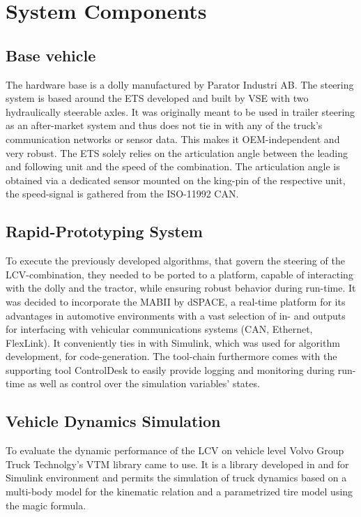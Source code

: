\documentclass[root.tex]{subfiles}
\begin{document}
{\pagestyle{empty}}
\section{System Components}
\label{chap:Hardware-Setup}
\subsection{Base vehicle}
\label{sec:basevehicle}

The hardware base is a dolly manufactured by Parator Industri AB\cite{paratorAB}. The steering system is based around the \gls{ETS} developed and built by \gls{VSE}\cite{vse} with two hydraulically steerable axles. It was originally meant to be used in trailer steering as an after-market system and thus does not tie in with any of the truck's communication networks or sensor data. This makes it OEM-independent and very robust. The \gls{ETS} solely relies on the articulation angle between the leading and following unit and the speed of the combination. The articulation angle is obtained via a dedicated sensor mounted on the king-pin of the respective unit, the speed-signal is gathered from the ISO-11992 \gls{CAN}. 

\subsection{Rapid-Prototyping System}

To execute the previously developed algorithms, that govern the steering of the \gls{LCV}-combination, they needed to be ported to a platform, capable of interacting with the dolly and the tractor, while ensuring robust behavior during run-time. It was decided to incorporate the \gls{MABII}\cite{mabii} by dSPACE\cite{dspace}, a real-time platform for its advantages in automotive environments with a vast selection of in- and outputs for interfacing with vehicular communications systems (\gls{CAN}, Ethernet, FlexLink). It conveniently ties in with Simulink, which was used for algorithm development, for code-generation. %
 The tool-chain furthermore comes with the supporting tool ControlDesk to easily provide logging and monitoring during run-time as well as control over the simulation variables' states.


\subsection{Vehicle Dynamics Simulation}
To evaluate the dynamic performance of the \gls{LCV} on vehicle level Volvo Group Truck Technolgy's\cite{volvogtt} \gls{VTM} library came to use. It is a library developed in and for Simulink environment and permits the simulation of truck dynamics based on a multi-body model for the kinematic relation and a parametrized tire model using the magic formula.
\end{document}

